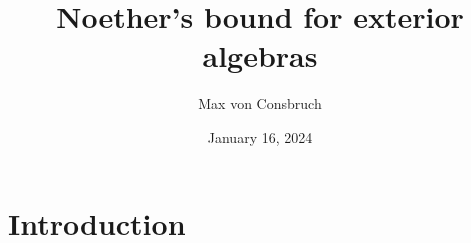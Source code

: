 \documentclass[a4paper,11pt]{article}
\title{Noether's bound for exterior algebras}
\author{Max von Consbruch}
\date{January 16, 2024}
\begin{document}
\maketitle

\section{Introduction}






{}
\end{document}
